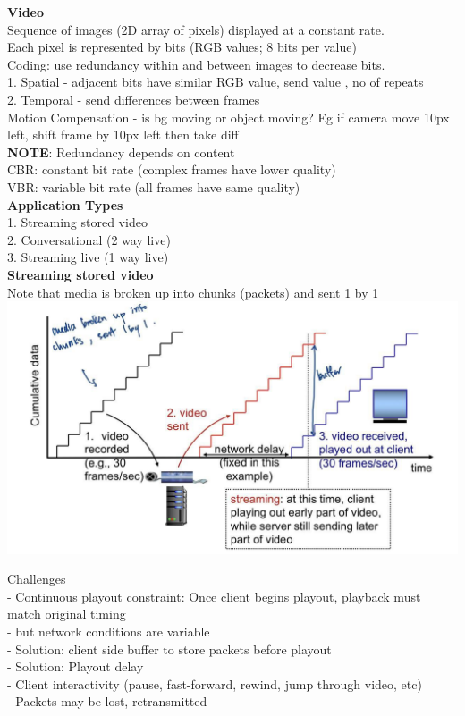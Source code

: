 \documentclass[10pt, a4paper]{article}
\newcommand{\highlight}[1]{{\color{red}\textbf{#1}}}
\newcommand{\blue}[1]{{\color{MidnightBlue}#1}}
\newcommand{\red}[1]{{\color{red}#1}}
\newcommand{\green}[1]{{\color{ForestGreen}#1}}
\newcommand{\tab}[0]{\hspace*{2mm}}
\begin{document}
\begin{multicols*}{3}
		\textbf{Video}\\
		\blue{Sequence of images (2D array of pixels)} displayed at a constant rate.\\
		Each pixel is represented by bits (RGB values; 8 bits per value)\\
		Coding: use redundancy \red{within} and \red{between} images to decrease bits.\\
		1. Spatial - adjacent bits have similar RGB value, send \red{value , no of repeats}\\
		2. Temporal - send \red{differences} between frames\\
		Motion Compensation - is bg moving or object moving? Eg if camera move 10px left, shift frame by 10px left then take diff\\
		\highlight{NOTE}: Redundancy depends on content\\
		CBR: constant bit rate (complex frames have lower quality)\\
		VBR: variable bit rate (all frames have same quality)\\

		\textbf{Application Types}\\
		1. Streaming stored video\\
		2. Conversational (2 way live)\\
		3. Streaming live (1 way live)\\
		\textbf{Streaming stored video}\\
		Note that media is broken up into chunks (packets) and sent 1 by 1\\
		\includegraphics[scale=.2]{./assets/streamingStored}

		Challenges\\
		- \red{Continuous playout constraint}: Once client begins playout, playback must match original timing\\
		\tab - but network conditions are variable\\
		\tab - \green{Solution}: client side buffer to store packets before playout\\
		\tab - \green{Solution}: Playout delay\\
		- Client interactivity (pause, fast-forward, rewind, jump through video, etc)\\
		- Packets may be lost, retransmitted\\


\end{multicols*}
\end{document}

